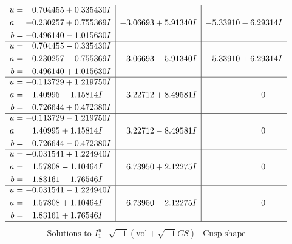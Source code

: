 \documentclass[1p]{elsarticle_modified}
\theoremstyle{definition}
\newcommand{\I}{\sqrt{-1}}
\begin{document}
$$\begin{array}{c|c|c}
\begin{aligned}
u &= \phantom{-}0.704455 + 0.335430 I \\
a &= -0.230257 + 0.755369 I \\
b &= -0.496140 - 1.015630 I\end{aligned}
 & -3.06693 + 5.91340 I & -5.33910 - 6.29314 I \\ \hline\begin{aligned}
u &= \phantom{-}0.704455 - 0.335430 I \\
a &= -0.230257 - 0.755369 I \\
b &= -0.496140 + 1.015630 I\end{aligned}
 & -3.06693 - 5.91340 I & -5.33910 + 6.29314 I \\ \hline\begin{aligned}
u &= -0.113729 + 1.219750 I \\
a &= \phantom{-}1.40995 - 1.15814 I \\
b &= \phantom{-}0.726644 + 0.472380 I\end{aligned}
 & \phantom{-}3.22712 + 8.49581 I & \phantom{-0.000000 } 0 \\ \hline\begin{aligned}
u &= -0.113729 - 1.219750 I \\
a &= \phantom{-}1.40995 + 1.15814 I \\
b &= \phantom{-}0.726644 - 0.472380 I\end{aligned}
 & \phantom{-}3.22712 - 8.49581 I & \phantom{-0.000000 } 0 \\ \hline\begin{aligned}
u &= -0.031541 + 1.224940 I \\
a &= \phantom{-}1.57808 - 1.10464 I \\
b &= \phantom{-}1.83161 - 1.76546 I\end{aligned}
 & \phantom{-}6.73950 + 2.12275 I & \phantom{-0.000000 } 0 \\ \hline\begin{aligned}
u &= -0.031541 - 1.224940 I \\
a &= \phantom{-}1.57808 + 1.10464 I \\
b &= \phantom{-}1.83161 + 1.76546 I\end{aligned}
 & \phantom{-}6.73950 - 2.12275 I & \phantom{-0.000000 } 0\\
 \hline 
 \end{array}$$\newpage$$\begin{array}{c|c|c}  
\text{Solutions to }I^u_{1}& \I (\text{vol} + \sqrt{-1}CS) & \text{Cusp shape}\\
 \hline 
\begin{aligned}

\end{aligned}
\end{array}$$
\end{document}
